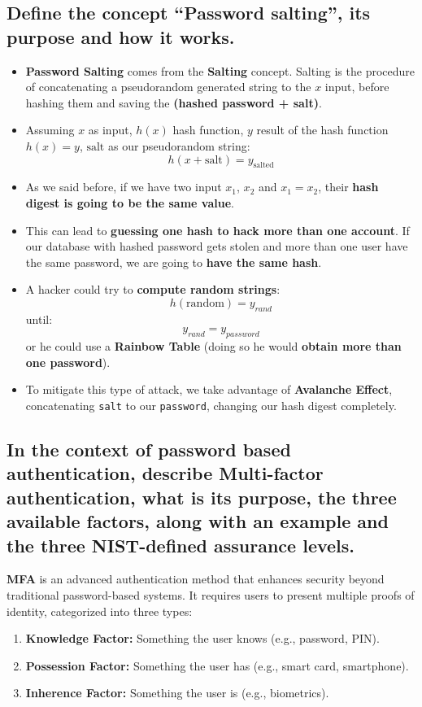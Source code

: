 \documentclass[9pt, letterpaper]{article}
\begin{document}
\subsection{Define the concept “Password salting”, its purpose and how it works.}
\begin{itemize}
	\item \textbf{Password Salting} comes from the \textbf{Salting} concept. Salting is the procedure of concatenating a pseudorandom generated string to the $x$ input, before hashing them and saving the \textbf{(hashed password + salt)}.
	\item Assuming $x$ as input, $h(x)$ hash function, $y$ result of the hash function $h(x)=y$, $\text{salt}$ as our pseudorandom string: $$h(x+\text{salt})=y_{\text{salted}}$$
	\item As we said before, if we have two input $x_1$, $x_2$ and $x_1=x_2$, their \textbf{hash digest is going to be the same value}.
	\item This can lead to \textbf{guessing one hash to hack more than one account}. If our database with hashed password gets stolen and more than one user have the same password, we are going to \textbf{have the same hash}.
	\item A hacker could try to \textbf{compute random strings}: $$h(\text{random})=y_{rand}$$ until: $$y_{rand} = y_{password}$$ or he could use a \textbf{Rainbow Table} (doing so he would \textbf{obtain more than one password}).
	\item To mitigate this type of attack, we take advantage of \textbf{Avalanche Effect}, concatenating {\tt salt} to our {\tt password}, changing our hash digest completely.
\end{itemize}

\subsection{In the context of password based authentication, describe Multi-factor authentication, what is its purpose, the three available factors, along with an example and the three NIST-defined assurance levels.}

\textbf{MFA} is an advanced authentication method that enhances security beyond traditional password-based systems. It requires users to present multiple proofs of identity, categorized into three types:

\begin{enumerate}
    \item \textbf{Knowledge Factor:} Something the user knows (e.g., password, PIN).
    \item \textbf{Possession Factor:} Something the user has (e.g., smart card, smartphone).
    \item \textbf{Inherence Factor:} Something the user is (e.g., biometrics).
\end{enumerate}
\end{document}
